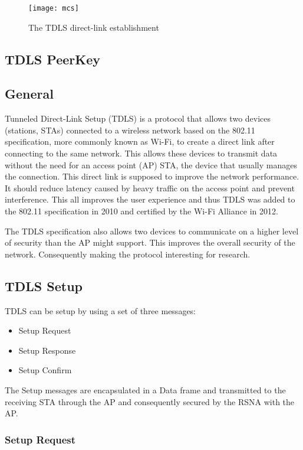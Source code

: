 \begin{figure}[!h]
	\centering
	\caption{The TDLS direct-link establishment}
	\texttt{[image: mcs]}
	\label{fig:mcs}
\end{figure}

\subsection{TDLS PeerKey}

\iffalse
\subsection{General}

Tunneled Direct-Link Setup (TDLS) is a protocol that allows two devices (stations, STAs) connected to a wireless network based on the 802.11 specification, more commonly known as Wi-Fi, to create a direct link after connecting to the same network. This allows these devices to transmit data without the need for an access point (AP) STA, the device that usually manages the connection\cite{tdlspress}. This direct link is supposed to improve the network performance. It should reduce latency caused by heavy traffic on the access point and prevent interference. This all improves the user experience and thus TDLS was added to the 802.11 specification in 2010 and certified by the Wi-Fi Alliance in 2012.

The TDLS specification also allows two devices to communicate on a higher level of security than the AP might support. This improves the overall security of the network. Consequently making the protocol interesting for research.

\subsection{TDLS Setup}

TDLS can be setup by using a set of three messages:
\begin{itemize}
	\item Setup Request
	\item Setup Response
	\item Setup Confirm
\end{itemize}

The Setup messages are encapsulated in a Data frame and transmitted to the receiving STA through the AP and consequently secured by the RSNA with the AP.

\subsubsection{Setup Request}


